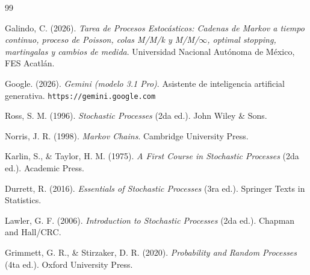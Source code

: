 \documentclass[10pt,a4paper]{article}
\begin{document}
\renewcommand{\refname}{Referencias}
\begin{thebibliography}{99}

Galindo, C. (2026).
\textit{Tarea de Procesos Estocásticos: Cadenas de Markov a tiempo continuo, proceso de Poisson, colas M/M/k y M/M/$\infty$, optimal stopping, martingalas y cambios de medida}.
Universidad Nacional Autónoma de México, FES Acatlán.

Google. (2026).
\textit{Gemini (modelo 3.1 Pro)}. 
Asistente de inteligencia artificial generativa. \texttt{https://gemini.google.com}

Ross, S. M. (1996).
\textit{Stochastic Processes} (2da ed.).
John Wiley \& Sons.

Norris, J. R. (1998).
\textit{Markov Chains}.
Cambridge University Press.

Karlin, S., \& Taylor, H. M. (1975).
\textit{A First Course in Stochastic Processes} (2da ed.).
Academic Press.

Durrett, R. (2016).
\textit{Essentials of Stochastic Processes} (3ra ed.).
Springer Texts in Statistics.

Lawler, G. F. (2006).
\textit{Introduction to Stochastic Processes} (2da ed.).
Chapman and Hall/CRC.

Grimmett, G. R., \& Stirzaker, D. R. (2020).
\textit{Probability and Random Processes} (4ta ed.).
Oxford University Press.

\end{thebibliography}
\end{document}
